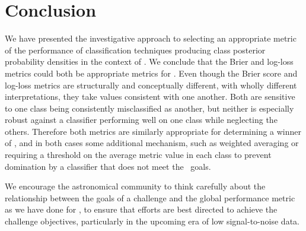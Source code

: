 \section{Conclusion}
\label{sec:conclusion}


We have presented the investigative approach to selecting an appropriate metric of the performance of classification techniques producing class posterior probability densities in the context of \plasticc.
We conclude that the Brier and log-loss metrics could both be appropriate metrics for \plasticc.
Even though the Brier score and log-loss metrics are structurally and conceptually different, with wholly different interpretations, they take values consistent with one another.
Both are sensitive to one class being consistently misclassified as another, but neither is especially robust against a classifier performing well on one class while neglecting the others.
Therefore both metrics are similarly appropriate for determining a winner of \plasticc, and in both cases some additional mechanism, such as weighted averaging or requiring a threshold on the average metric value in each class to prevent domination by a classifier that does not meet the \plasticc\ goals.

We encourage the astronomical community to think carefully about the relationship between the goals of a challenge and the global performance metric as we have done for \plasticc, to ensure that efforts are best directed to achieve the challenge objectives, particularly in the upcoming era of low signal-to-noise data.
